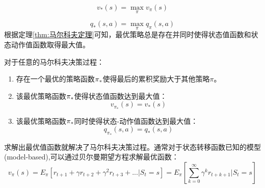 \begin{equation}
\label{eq:6}
{v_*}(s) = \mathop {\max }\limits_\pi  {v_\pi }(s)
\end{equation}

\begin{equation}
\label{eq:7}
{q_*}(s,a) = \mathop {\max }\limits_\pi  {q_\pi }(s,a)
\end{equation}
根据定理\ref{thm:马尔科夫定理}可知，最优策略总是存在并同时使得状态值函数和状态动作值函数取得最大值。
\begin{thm}[马尔科夫定理]
\label{thm:马尔科夫定理}
对于任意的马尔科夫决策过程：
\begin{enumerate}
	\item 存在一个最优的策略函数${\pi _{\rm{*}}}$使得最后的累积奖励大于其他策略$ \pi$。
	\item 该最优策略函数${\pi _{\rm{*}}}$使得状态值函数达到最大值：
	\begin{equation}
	\label{eq:optimal}
	{v_{{\pi _*}}}(s) = {v_*}(s)
	\end{equation}
	\item 该最优策略函数${\pi _{\rm{*}}}$同时使得状态-动作值函数达到最大值：
	\begin{equation}
	{q_{{\pi _*}}}(s,a) = {q_*}(s,a)
	\end{equation}
	
\end{enumerate}
\end{thm}

求解出最优值函数就解决了马尔科夫决策过程。通常对于状态转移函数已知的模型(model-based),可以通过贝尔曼期望方程求解最优函数：
\begin{equation}
\label{eq:bell1}
{v_\pi }(s) = {E_\pi }[{r_{t + 1}} + \gamma {r_{t + 2}} + {\gamma ^2}{r_{t + 3}} + ...|{S_t} = s] = {E_\pi }[\sum\limits_{k = 0}^\infty  {{\gamma ^k}{r_{t + k + 1}}|{S_t}}  = s]
\end{equation}

